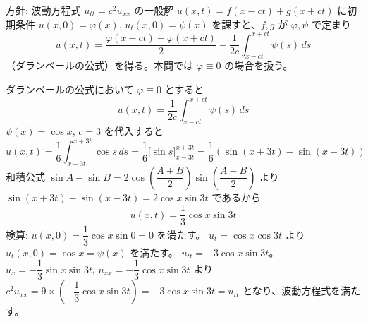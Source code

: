 
方針: 波動方程式 $u_{tt}=c^2u_{xx}$ の一般解 $u(x,t)=f(x-ct)+g(x+ct)$ に初期条件 $u(x,0)=\varphi(x)$, $u_t(x,0)=\psi(x)$ を課すと、$f,g$ が $\varphi,\psi$ で定まり
\[
u(x,t) = \frac{\varphi(x-ct) + \varphi(x+ct)}{2} + \frac{1}{2c}\int_{x-ct}^{x+ct} \psi(s)\,ds
\]
（ダランベールの公式）を得る。本問では $\varphi \equiv 0$ の場合を扱う。

ダランベールの公式において $\varphi \equiv 0$ とすると
\[
\boxed{\; u(x,t) = \frac{1}{2c}\int_{x-ct}^{x+ct} \psi(s)\,ds \;}
\]
$\psi(x) = \cos x$, $c = 3$ を代入すると
\[
u(x,t) = \frac{1}{6}\int_{x-3t}^{x+3t} \cos s\,ds
= \frac{1}{6}\Big[\sin s\Big]_{x-3t}^{x+3t}
= \frac{1}{6}\left(\sin(x+3t) - \sin(x-3t)\right)
\]
和積公式 $\sin A - \sin B = 2\cos\left(\dfrac{A+B}{2}\right)\sin\left(\dfrac{A-B}{2}\right)$ より $\sin(x+3t)-\sin(x-3t) = 2\cos x \sin 3t$ であるから
\[
\boxed{\; u(x,t) = \frac{1}{3}\cos x \sin 3t \;}
\]
検算: $u(x,0) = \dfrac{1}{3}\cos x \sin 0 = 0$ を満たす。
$u_t = \cos x \cos 3t$ より $u_t(x,0) = \cos x = \psi(x)$ を満たす。
$u_{tt} = -3\cos x \sin 3t$。$u_x = -\dfrac{1}{3}\sin x \sin 3t$, $u_{xx} = -\dfrac{1}{3}\cos x \sin 3t$ より $c^{2}u_{xx} = 9 \times \left(-\dfrac{1}{3}\cos x \sin 3t\right) = -3\cos x \sin 3t = u_{tt}$ となり、波動方程式を満たす。
